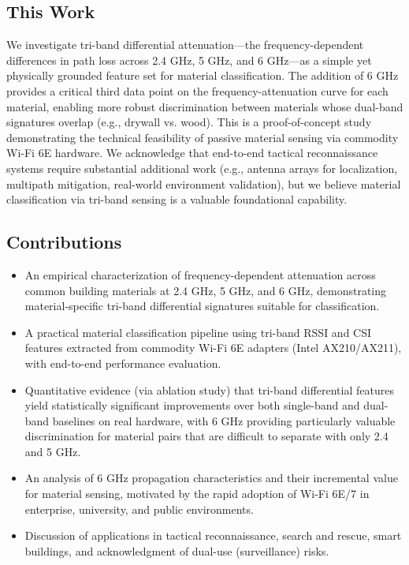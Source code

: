 \documentclass[conference]{IEEEtran}
\begin{document}
\subsection{This Work}

We investigate tri-band differential attenuation—the frequency-dependent differences in path loss across 2.4 GHz, 5 GHz, and 6 GHz—as a simple yet physically grounded feature set for material classification. The addition of 6 GHz provides a critical third data point on the frequency-attenuation curve for each material, enabling more robust discrimination between materials whose dual-band signatures overlap (e.g., drywall vs. wood). This is a proof-of-concept study demonstrating the technical feasibility of passive material sensing via commodity Wi-Fi 6E hardware. We acknowledge that end-to-end tactical reconnaissance systems require substantial additional work (e.g., antenna arrays for localization, multipath mitigation, real-world environment validation), but we believe material classification via tri-band sensing is a valuable foundational capability.

\subsection{Contributions}

\begin{itemize}
    \item An empirical characterization of frequency-dependent attenuation across common building materials at 2.4 GHz, 5 GHz, and 6 GHz, demonstrating material-specific tri-band differential signatures suitable for classification.
    \item A practical material classification pipeline using tri-band RSSI and CSI features extracted from commodity Wi-Fi 6E adapters (Intel AX210/AX211), with end-to-end performance evaluation.
    \item Quantitative evidence (via ablation study) that tri-band differential features yield statistically significant improvements over both single-band and dual-band baselines on real hardware, with 6 GHz providing particularly valuable discrimination for material pairs that are difficult to separate with only 2.4 and 5 GHz.
    \item An analysis of 6 GHz propagation characteristics and their incremental value for material sensing, motivated by the rapid adoption of Wi-Fi 6E/7 in enterprise, university, and public environments.
    \item Discussion of applications in tactical reconnaissance, search and rescue, smart buildings, and acknowledgment of dual-use (surveillance) risks.
\end{itemize}
\end{document}
